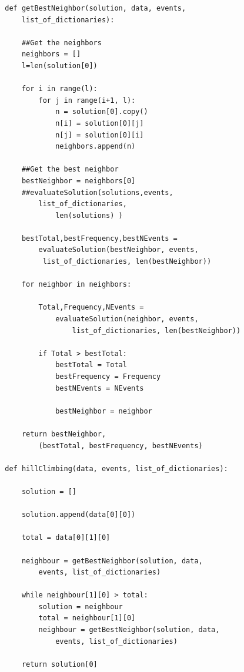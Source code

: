 \documentclass{article}
\begin{document}
    \begin{lstlisting}
        def getBestNeighbor(solution, data, events, 
            list_of_dictionaries):
            
            ##Get the neighbors
            neighbors = []
            l=len(solution[0])

            for i in range(l):
                for j in range(i+1, l):
                    n = solution[0].copy()
                    n[i] = solution[0][j]
                    n[j] = solution[0][i]
                    neighbors.append(n)
            
            ##Get the best neighbor
            bestNeighbor = neighbors[0]
            ##evaluateSolution(solutions,events,
                list_of_dictionaries,
                    len(solutions) )
            
            bestTotal,bestFrequency,bestNEvents = 
                evaluateSolution(bestNeighbor, events,
                 list_of_dictionaries, len(bestNeighbor))
    
            for neighbor in neighbors:
        
                Total,Frequency,NEvents = 
                    evaluateSolution(neighbor, events, 
                        list_of_dictionaries, len(bestNeighbor))
        
                if Total > bestTotal:
                    bestTotal = Total
                    bestFrequency = Frequency
                    bestNEvents = NEvents

                    bestNeighbor = neighbor

            return bestNeighbor, 
                (bestTotal, bestFrequency, bestNEvents)

        def hillClimbing(data, events, list_of_dictionaries):
    
            solution = []
    
            solution.append(data[0][0])

            total = data[0][1][0]
    
            neighbour = getBestNeighbor(solution, data, 
                events, list_of_dictionaries)

            while neighbour[1][0] > total:
                solution = neighbour
                total = neighbour[1][0]
                neighbour = getBestNeighbor(solution, data, 
                    events, list_of_dictionaries)

            return solution[0]
        

\end{lstlisting}
\end{document}
